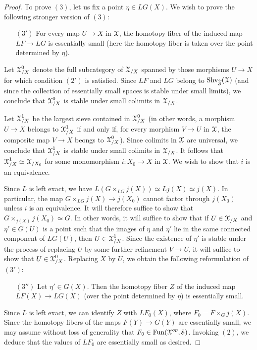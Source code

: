 \begin{proof}
To prove $(3)$, let us fix a point $\eta \in LG(X)$. We wish to prove the following stronger version of
$(3)$:
\begin{itemize}
\item[$(3')$] For every map $U \rightarrow X$ in $\operatorname{\mathcal{X}}$, the homotopy fiber of the induced map
$LF \rightarrow LG$ is essentially small (here the homotopy fiber is taken over the point determined by $\eta$).
\end{itemize}

Let $\operatorname{\mathcal{X}}^{0}_{/X}$ denote the full subcategory of $\operatorname{\mathcal{X}}_{/X}$ spanned by those morphisms
$U \rightarrow X$ for which condition $(2')$ is satisfied. Since $LF$ and $LG$ belong to
$\operatorname{Shv}_{\widehat{\operatorname{\mathcal{S}}}}(\operatorname{\mathcal{X}})$ (and since the collection of essentially small spaces is stable under small limits), we conclude that $\operatorname{\mathcal{X}}^{0}_{/X}$ is stable under small colimits in $\operatorname{\mathcal{X}}_{/X}$. 

Let $\operatorname{\mathcal{X}}^{1}_{/X}$ be the largest sieve contained in $\operatorname{\mathcal{X}}^{0}_{/X}$ (in other words, a morphism $U \rightarrow X$ belongs to $\operatorname{\mathcal{X}}^{1}_{/X}$ if and only if, for every morphism $V \rightarrow U$ in $\operatorname{\mathcal{X}}$, the composite map $V \rightarrow X$ beongs to $\operatorname{\mathcal{X}}^{0}_{/X}$). Since colimits in $\operatorname{\mathcal{X}}$ are universal, we conclude that $\operatorname{\mathcal{X}}^{1}_{/X}$ is stable under small colimits in $\operatorname{\mathcal{X}}_{/X}$. It
follows that $\operatorname{\mathcal{X}}^{1}_{/X} \simeq \operatorname{\mathcal{X}}_{/X_0}$ for some monomorphism
$i: X_0 \rightarrow X$ in $\operatorname{\mathcal{X}}$. We wish to show that $i$ is an equivalence.

Since $L$ is left exact, we have $L( G \times_{LG} j(X) ) \simeq L j(X) \simeq j(X)$.
In particular, the map $G \times_{LG} j(X) \rightarrow j(X_0)$ cannot factor through $j(X_0)$ 
unless $i$ is an equivalence. It will therefore suffice to show that $G \times_{ j(X) } j(X_0) \simeq G$.
In other words, it will suffice to show that if $U \in \operatorname{\mathcal{X}}_{/X}$ and $\eta' \in G(U)$ is a point such that
the images of $\eta$ and $\eta'$ lie in the same connected component of $LG(U)$, then
$U \in \operatorname{\mathcal{X}}^{1}_{/X}$. Since the existence of $\eta'$ is stable under the process of
replacing $U$ by some further refinement $V \rightarrow U$, it will suffice to show that
$U \in \operatorname{\mathcal{X}}^{0}_{/X}$. Replacing $X$ by $U$, we obtain the following reformulation of $(3')$:

\begin{itemize}
\item[$(3'')$] Let $\eta' \in G(X)$. Then the homotopy fiber $Z$ of the induced map
$LF(X) \rightarrow LG(X)$ (over the point determined by $\eta$) is essentially small.
\end{itemize}

Since $L$ is left exact, we can identify $Z$ with $LF_0(X)$, where
$F_0 = F \times_{G} j(X)$. Since the homotopy fibers of the maps $F(Y) \rightarrow G(Y)$ are
essentially small, we may assume without loss of generality that $F_0 \in \operatorname{Fun}( \operatorname{\mathcal{X}}^{op}, \operatorname{\mathcal{S}})$. 
Invoking $(2)$, we deduce that the values of $LF_0$ are essentially small as desired.
\end{proof}

